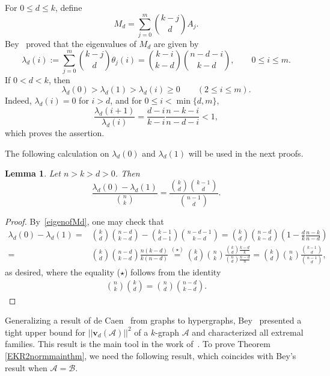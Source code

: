 \documentclass[11pt]{article}
\numberwithin{equation}{section}
\newtheorem{lemma}[theorem]{Lemma}
\def\A{\mathcal{A}}
\def\B{\mathcal{B}}
\begin{document}
For $0\leq d\leq k$, define
\[
M_d=\sum_{j=0}^{m}\binom{k-j}{d}A_j.
\]
Bey~\cite{Bey} proved that the eigenvalues of $M_d$ are given by
\begin{equation}\label{eigenofMd}
\lambda_d(i)
:=\sum_{j=0}^{m}\binom{k-j}{d}\theta_j(i)
=\binom{k-i}{k-d}\binom{n-d-i}{k-d},
\qquad 0\leq i\leq m.
\end{equation}
If $0<d<k$, then
\[
\lambda_d(0)>\lambda_d(1)>\lambda_d(i)\geq0
\qquad (2\leq i\leq m).
\]
Indeed,
$\lambda_d(i)=0$ for $i>d$, and for
$0\leq i<\min\{d,m\}$,
\[
\frac{\lambda_d(i+1)}{\lambda_d(i)}
=\frac{d-i}{k-i}\frac{n-k-i}{n-d-i}<1,
\]
which proves the assertion.

The following calculation on $\lambda _d(0)$ and $\lambda _d(1)$ will be used in the next proofs.


\begin{lemma}\label{eigenvalue01ofMd}
Let $n>k>d>0$.  Then
\[
\frac{\lambda_d(0)-\lambda_d(1)}{\binom{n}{k}}
=\frac{\binom{k}{d}\binom{k-1}{d}}{\binom{n-1}{d}}.
\]
\end{lemma}

\begin{proof}
By~\eqref{eigenofMd}, one may check that
\begin{align*}
\lambda _d(0)-\lambda _d(1) =&\binom{k }{ d}
\binom{n-d}{k-d}
-   \binom{k-1}{ d-1}
\binom{n-d-1}{k-d}
= \binom{k}{d}\binom{n-d}{k-d}
\left(1- \frac{d}{k} \frac{n-k}{n-d} \right)\\
=&  \binom{k}{d}\binom{n-d}{k-d}
\frac{n(k-d)} {k(n-d)}
\overset{(\star)}{=}\binom{k}{d} \binom{n}{k} \frac{\binom{k}{d} \frac{k-d}{k}} {\binom{n}{d}\frac{n-d}{n}   }
=\binom{k}{d}\binom{n}{k} \frac{\binom{k-1}{d}}{\binom{n-1}{d}},
\end{align*}
as desired,
where the equality ($\star$) follows from the identity
\begin{align*}\binom{n}{k}\binom{k}{d}
=\binom{n}{d}\binom{n-d}{k-d}.  \tag*{\qedhere}
\end{align*}
\end{proof}

Generalizing a result of de Caen~\cite[Theorem 1]{Caen} from graphs to hypergraphs,
Bey~\cite[Theorem 1]{Bey} presented a tight upper bound for
$||\mathbf{v}_{d}(\A)||^2$ of a $k$-graph $\A$ and characterized all extremal families.
This result is the main tool in the work of~\cite{Brooks}.
To prove Theorem \ref{EKR2normmainthm}, we need the following result, which
coincides with Bey's result when $\A=\B$.
\end{document}
